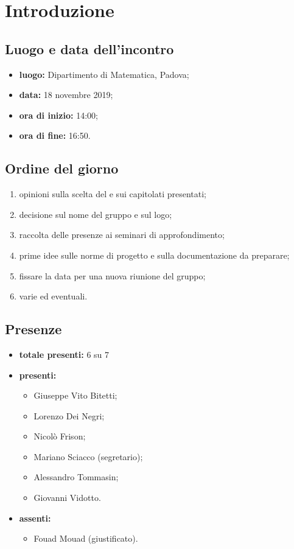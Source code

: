 \section*{Introduzione}

\subsection*{Luogo e data dell'incontro}
	\begin{itemize}
		\item \textbf{luogo:} Dipartimento di Matematica, Padova;
		\item \textbf{data:} 18 novembre 2019;
		\item \textbf{ora di inizio:} 14:00;
		\item \textbf{ora di fine:} 16:50.
	\end{itemize}

\subsection*{Ordine del giorno}
	\begin{enumerate}

		\item opinioni sulla scelta del  e sui capitolati presentati;
		\item decisione sul nome del gruppo e sul logo;
		\item raccolta delle presenze ai seminari di approfondimento;
		\item prime idee sulle norme di progetto e sulla documentazione da preparare;
		\item fissare la data per una nuova riunione del gruppo;
		\item varie ed eventuali.

	\end{enumerate}

\subsection*{Presenze}
	\begin{itemize}
		\item \textbf{totale presenti:} 6 su 7
		\item \textbf{presenti: }
			\begin{itemize}			
				\item Giuseppe Vito Bitetti;
				\item Lorenzo Dei Negri;
				\item Nicolò Frison;
				\item Mariano Sciacco (segretario);
				\item Alessandro Tommasin;
				\item Giovanni Vidotto.
			\end{itemize}
		\item \textbf{assenti: } 
			\begin{itemize}	
				\item Fouad Mouad (giustificato).
			\end{itemize}
	\end{itemize}


